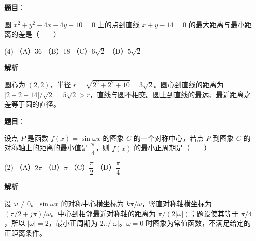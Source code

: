\begin{answer}

\textbf{题目}：

圆 $x^2+y^2-4x-4y-10=0$ 上的点到直线 $x+y-14=0$ 的最大距离与最小距离的差是\mbox{（　　）}

\begin{gkopts}(4)
\task （A）36
\task （B）18
\task （C）$6\sqrt2$
\task （D）$5\sqrt2$
\end{gkopts}

\textbf{解析}

圆心为 $(2,2)$，半径 $r=\sqrt{2^2+2^2+10}=3\sqrt2$。圆心到直线的距离为 $|2+2-14|/\sqrt2=5\sqrt2>r$，直线与圆不相交。圆上到直线的最远、最近距离之差等于圆的直径。


\end{answer}
\begin{answer}

\textbf{题目}：

设点 $P$ 是函数 $f(x)=\sin\omega x$ 的图象 $C$ 的一个对称中心，若点 $P$ 到图象 $C$ 的对称轴上的距离的最小值是 $\dfrac{\pi}{4}$，则 $f(x)$ 的最小正周期是\mbox{（　　）}

\begin{gkopts}(2)
\task （A）$2\pi$
\task （B）$\pi$
\task （C）$\dfrac{\pi}{2}$
\task （D）$\dfrac{\pi}{4}$
\end{gkopts}

\textbf{解析}

设 $\omega\ne0$。$\sin\omega x$ 的对称中心横坐标为 $k\pi/\omega$，竖直对称轴横坐标为 $(\pi/2+j\pi)/\omega$。中心到相邻最近对称轴的距离为 $\pi/(2|\omega|)$；题设使其等于 $\pi/4$，所以 $|\omega|=2$，最小正周期为 $2\pi/|\omega|$。$\omega=0$ 时图象为常值函数，不满足给定的正距离条件。


\end{answer}
